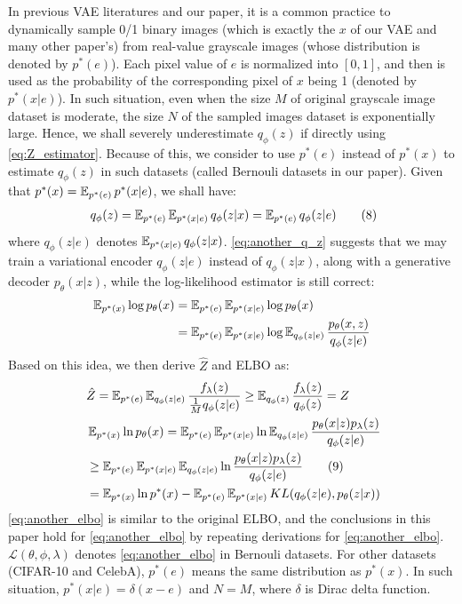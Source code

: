 In previous VAE literatures and our paper, it is a common practice to dynamically sample 0/1 binary images (which is exactly the $x$ of our VAE and many other paper's) from real-value grayscale images (whose distribution is denoted by $p^*(e)$). Each pixel value of $e$ is normalized into $[0, 1]$, and then is used as the probability of the corresponding pixel of $x$ being 1 (denoted by $p^*(x|e)$). In such situation, even when the size $M$ of original grayscale image dataset is moderate, the size $N$ of the sampled images dataset is exponentially large. Hence, we shall severely underestimate $q_\phi(z)$ if directly using \cref{eq:Z_estimator}. Because of this, we consider to use $p^*(e)$ instead of $p^*(x)$ to estimate $q_\phi(z)$ in such datasets (called Bernouli datasets in our paper). Given that $p^*(x) = \operatorname{\mathbb{E}}_{p^*(e)} p^*(x|e)$, we shall have:
\begin{align*}~\label{eq:another_q_z}
	q_\phi(z) = \operatorname{\mathbb{E}}_{p^*(e)} \operatorname{\mathbb{E}}_{p^*(x|e)} q_\phi(z|x) = \operatorname{\mathbb{E}}_{p^*(e)}q_\phi(z|e) \tag{8}
\end{align*}
where $q_\phi(z|e)$ denotes $\operatorname{\mathbb{E}}_{p^*(x|e)} q_\phi(z|x)$. \cref{eq:another_q_z} suggests that we may train a variational encoder $q_\phi(z|e)$ instead of $q_\phi(z|x)$, along with a generative decoder $p_\theta(x|z)$, while the log-likelihood estimator is still correct:
\begin{align*}
	\operatorname{\mathbb{E}}_{p^*(x)} \log p_\theta(x) &= \operatorname{\mathbb{E}}_{p^*(e)} \operatorname{\mathbb{E}}_{p^*(x|e)} \log p_\theta(x) \\
	&= \operatorname{\mathbb{E}}_{p^*(e)} \operatorname{\mathbb{E}}_{p^*(x|e)} \log \operatorname{\mathbb{E}}_{q_\phi(z|e)} \frac{p_\theta(x, z)}{q_\phi(z|e)}
\end{align*}
Based on this idea, we then derive $\hat{Z}$ and ELBO as:
\begin{align*}~\label{eq:another_elbo}
    &\hat{Z} = \operatorname{\mathbb{E}}_{p^*(e)}\operatorname{\mathbb{E}}_{q_\phi(z|e)} \frac{f_\lambda(z)}{\frac{1}{M}q_\phi(z|e)} \geq
	\operatorname{\mathbb{E}}_{q_\phi(z)}\frac{f_\lambda(z)}{q_\phi(z)} = Z \\
	&\operatorname{\mathbb{E}}_{p^*(x)} \ln p_\theta(x) = \operatorname{\mathbb{E}}_{p^*(e)} \operatorname{\mathbb{E}}_{p^*(x|e)} \ln \operatorname{\mathbb{E}}_{q_\phi(z|e)} \frac{p_\theta(x|z)p_\lambda(z)}{q_\phi(z|e)} \\
    &\geq \operatorname{\mathbb{E}}_{p^*(e)} \operatorname{\mathbb{E}}_{p^*(x|e)} \operatorname{\mathbb{E}}_{q_\phi(z|e)} \ln \frac{p_\theta(x|z)p_\lambda(z)}{q_\phi(z|e)} \tag{9} \\
    &= \operatorname{\mathbb{E}}_{p^*(x)} \ln p^*(x) - \operatorname{\mathbb{E}}_{p^*(e)} \operatorname{\mathbb{E}}_{p^*(x|e)} KL(q_\phi(z|e), p_\theta(z|x)) 
\end{align*}
\cref{eq:another_elbo} is similar to the original ELBO, and the conclusions in this paper hold for \cref{eq:another_elbo} by repeating derivations for \cref{eq:another_elbo}. $\mathcal{L}(\theta, \phi, \lambda)$ denotes \cref{eq:another_elbo} in Bernouli datasets. 
For other datasets (\EG CIFAR-10 and CelebA), $p^*(e)$ means the same distribution as $p^*(x)$. In such situation, $p^*(x|e) = \delta(x - e)$ and $N = M$, where $\delta$ is Dirac delta function.%

